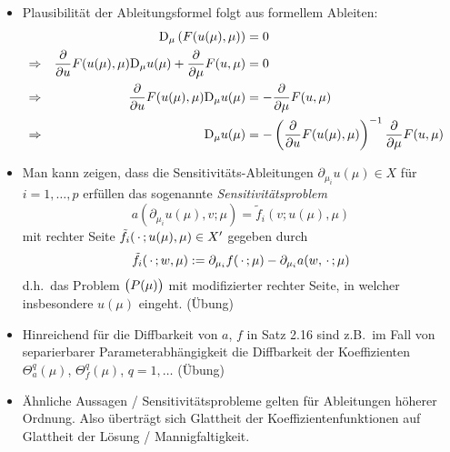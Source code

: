 \begin{bem} \beginwithlistbem
	\begin{itemize}
		\item Plausibilität der Ableitungsformel folgt aus formellem Ableiten:
			\begin{align*}
				&&\mathrm{D}_\mu \left(F(u(\mu),\mu)\right) &= 0 &\\
				&\Rightarrow& \frac{\partial}{\partial {u}} F(u(\mu),\mu) \mathrm{D}_\mu u(\mu) + \frac{\partial}{\partial {\mu}} F(u,\mu) &= 0 &\\
				&\Rightarrow& \frac{\partial}{\partial {u}} F(u(\mu),\mu) \mathrm{D}_\mu u(\mu) &= -\frac{\partial}{\partial {\mu}} F(u,\mu) &\\
				&\Rightarrow& \mathrm{D}_\mu u(\mu) &= -\left(\frac{\partial}{\partial {u}} F(u(\mu),\mu) \right)^{-1} \frac{\partial}{\partial {\mu}} F(u,\mu) &
			\end{align*}
		\item Man kann zeigen, dass die Sensitivitäts-Ableitungen $\partial_{\mu_i} u(\mu) \in X$ für $i = 1,\dots,p$ erfüllen das sogenannte \emph{Sensitivitätsproblem}
			\[
				a(\partial_{\mu_i} u(\mu),v;\mu) = \tilde f_i(v;u(\mu),\mu)
			\]
			mit rechter Seite $\tilde f_i(\,\cdot\,; u(\mu),\mu) \in X'$ gegeben durch
			\[
				\tilde f_i(\,\cdot\,;w,\mu) := \partial_{\mu_i} f(\,\cdot\,;\mu) - \partial_{\mu_i} a(w,\,\cdot\,;\mu)
			\]
			d.h.\ das Problem $\big(P(\mu)\big)$ mit modifizierter rechter Seite, in welcher insbesondere $u(\mu)$ eingeht. (Übung)
		\item Hinreichend für die Diffbarkeit von $a$, $f$ in Satz 2.16 sind z.B.\ im Fall von separierbarer Parameterabhängigkeit die Diffbarkeit der Koeffizienten $\Theta_a^q(\mu)$, $\Theta_f^q(\mu)$, $q = 1,\dots$ (Übung)
		\item Ähnliche Aussagen / Sensitivitätsprobleme gelten für Ableitungen höherer Ordnung.
			Also überträgt sich Glattheit der Koeffizientenfunktionen auf Glattheit der Lösung / Mannigfaltigkeit.
	\end{itemize}
\end{bem}
